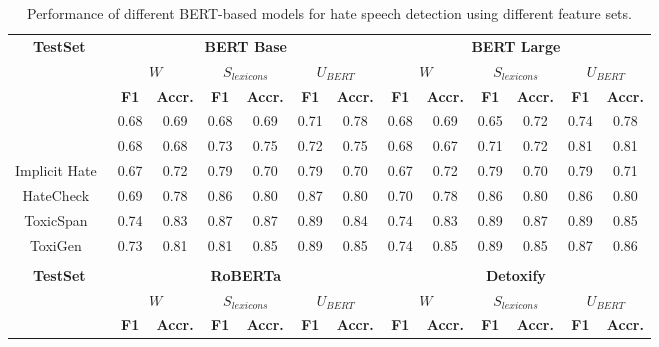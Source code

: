 \begin{table*}[ht]
\centering
\caption{Performance of different BERT-based models for hate speech detection using different feature sets.}
\label{tab:BERTPerformance}
\small
\begin{tabular}{||c|c|c|c|c|c|c||c|c|c|c|c|c||}
\hline
\multirow{3}{*}{\textbf{TestSet}} & \multicolumn{6}{c||}{\textbf{BERT Base}} & \multicolumn{6}{c||}{\textbf{BERT Large}} \\ \cline{2-13} 
 & \multicolumn{2}{c|}{$W$} & \multicolumn{2}{c|}{$S_{lexicons}$} & \multicolumn{2}{c||}{$U_{BERT}$} & \multicolumn{2}{c|}{$W$} & \multicolumn{2}{c|}{$S_{lexicons}$} & \multicolumn{2}{c||}{$U_{BERT}$} \\ \cline{2-13}
 & \textbf{F1} & \textbf{Accr.} & \textbf{F1} & \textbf{Accr.} & \textbf{F1} & \textbf{Accr.} & \textbf{F1} & \textbf{Accr.} & \textbf{F1} & \textbf{Accr.} & \textbf{F1} & \textbf{Accr.} \\ \hline
 
\citeauthor{davidson2017automated}\cite{davidson2017automated} & 0.68 & 0.69 & 0.68 & 0.69 & 0.71 & 0.78 & 0.68 & 0.69 & 0.65 & 0.72 & 0.74 & 0.78 \\ \hline
\citeauthor{founta2018large}\cite{founta2018large} & 0.68 & 0.68 & 0.73 & 0.75 & 0.72 & 0.75 & 0.68 & 0.67 & 0.71 & 0.72 & 0.81 & 0.81 \\ \hline
Implicit Hate~\cite{elsherief-etal-2021-latent} & 0.67 & 0.72 & 0.79 & 0.70 & 0.79 & 0.70 & 0.67 & 0.72 & 0.79 & 0.70 & 0.79 & 0.71 \\ \hline
HateCheck~\cite{rottger-etal-2021-hatecheck} & 0.69 & 0.78 & 0.86 & 0.80 & 0.87 & 0.80 & 0.70 & 0.78 & 0.86 & 0.80 & 0.86 & 0.80 \\ \hline
ToxicSpan~\cite{pavlopoulos-etal-2022-acl} & 0.74 & 0.83 & 0.87 & 0.87 & 0.89 & 0.84 & 0.74 & 0.83 & 0.89 & 0.87 & 0.89 & 0.85 \\ \hline
ToxiGen~\cite{hartvigsen-etal-2022-toxigen} & 0.73 & 0.81 & 0.81 & 0.85 & 0.89 & 0.85 & 0.74 & 0.85 & 0.89 & 0.85 & 0.87 & 0.86 \\ \hline

\multicolumn{13}{c}{} \\ \hline
\multirow{3}{*}{\textbf{TestSet}} & \multicolumn{6}{c||}{\textbf{RoBERTa}} & \multicolumn{6}{c||}{\textbf{Detoxify}} \\ \cline{2-13} 
 & \multicolumn{2}{c|}{$W$} & \multicolumn{2}{c|}{$S_{lexicons}$} & \multicolumn{2}{c||}{$U_{BERT}$} & \multicolumn{2}{c|}{$W$} & \multicolumn{2}{c|}{$S_{lexicons}$} & \multicolumn{2}{c||}{$U_{BERT}$} \\ \cline{2-13}
 & \textbf{F1} & \textbf{Accr.} & \textbf{F1} & \textbf{Accr.} & \textbf{F1} & \textbf{Accr.} & \textbf{F1} & \textbf{Accr.} & \textbf{F1} & \textbf{Accr.} & \textbf{F1} & \textbf{Accr.} \\ \hline
 

\end{tabular}
\end{table*}
